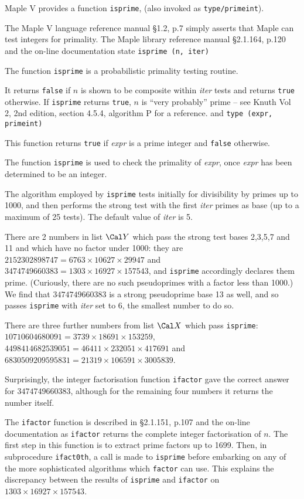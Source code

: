 Maple V provides a function {\tt isprime}, (also invoked as {\tt type/primeint}).

The Maple V language reference manual \cite{15} \S1.2, p.7 simply asserts that Maple can
test integers for primality.  The Maple library reference 
manual \cite{16} \S2.1.164, p.120 and the on-line documentation state
\block
{\tt isprime (n, iter)}

The function {\tt isprime} is a probabilistic primality testing routine.

It returns {\tt false} if $n$ is shown to be composite within {\it iter} tests
and returns {\tt true} otherwise.  If {\tt isprime} returns {\tt true}, $n$ is
``very probably'' prime -- see Knuth Vol 2, 2nd edition, section 4.5.4,
algorithm P for a reference.
\endblock
and
\block
{\tt type (expr, primeint)}

This function returns {\tt true} if {\it expr} is a prime integer and {\tt false} 
otherwise.

The function {\tt isprime} is used to check the primality of {\it expr}, 
once {\it expr} has been determined to be an integer.
\endblock

The algorithm employed by {\tt isprime} tests initially for divisibility by primes
up to 1000, and then performs the strong test with the first {\it iter} primes
as base (up to a maximum of 25 tests).  The default value of {\it iter} is 5.

There are 2 numbers in list $\sY$ which pass the strong test bases 2,3,5,7 and 11
and which have no factor under 1000: they 
are $2152302898747 = 6763 \times 10627 \times 29947$
and $3474749660383 = 1303 \times 16927 \times 157543$, 
and {\tt isprime} accordingly declares them prime.
(Curiously, there are no such pseudoprimes with a factor less than 1000.)
We find that $3474749660383$ is a strong pseudoprime base 13 as well, and so
passes {\tt isprime} with {\it iter} set to 6, the smallest number to do so.

There are three further numbers from list $\sX$ which pass {\tt isprime}:
$10710604680091 = 3739 \times 18691 \times 153259$, 
$4498414682539051 = 46411 \times 232051 \times 417691$ 
and $6830509209595831 = 21319 \times 106591 \times 3005839$.

Surprisingly, the integer factorisation function {\tt ifactor} 
gave the correct answer for $3474749660383$, 
although for the remaining four numbers it returns the
number itself.

The {\tt ifactor} function is described in \cite{16} \S2.1.151, p.107 and
the on-line documentation as
\block
{\tt ifactor} returns the complete integer factorisation of $n$.
\endblock
The first step in this function is to extract prime factors up to 1699.  Then,
in subprocedure {\tt ifact0th}, a call is made to
{\tt isprime} before embarking on any of the more sophisticated algorithms which
{\tt factor} can use.  This explains the discrepancy between the results of
{\tt isprime} and {\tt ifactor} on $1303 \times 16927 \times 157543$.

